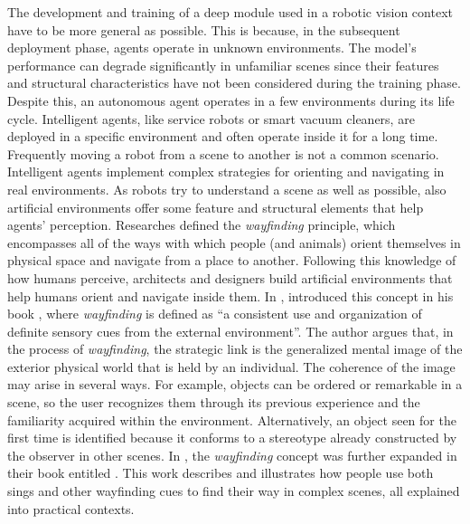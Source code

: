 The development and training of a deep module used in a robotic vision context have to be more general as possible. This is because, in the subsequent deployment phase, agents operate in unknown environments. The model's performance can degrade significantly in unfamiliar scenes since their features and structural characteristics have not been considered during the training phase. Despite this, an autonomous agent operates in a few environments during its life cycle. Intelligent agents, like service robots or smart vacuum cleaners, are deployed in a specific environment and often operate inside it for a long time. Frequently moving a robot from a scene to another is not a common scenario. Intelligent agents implement complex strategies for orienting and navigating in real environments. As robots try to understand a scene as well as possible, also artificial environments offer some feature and structural elements that help agents' perception. Researches defined the \textit{wayfinding} principle, which encompasses all of the ways with which people (and animals) orient themselves in physical space and navigate from a place to another. Following this knowledge of how humans perceive, architects and designers build artificial environments that help humans orient and navigate inside them. In \citeyear{imageofcity}, \citeauthor{imageofcity} introduced this concept in his book , where \textit{wayfinding} is defined as ``a consistent use and organization of definite sensory cues from the external environment''.  The author argues that, in the process of \textit{wayfinding}, the strategic link is the generalized mental image of the exterior physical world that is held by an individual. The coherence of the image may arise in several ways. For example, objects can be ordered or remarkable in a scene, so the user recognizes them through its previous experience and the familiarity acquired within the environment. Alternatively, an object seen for the first time is identified because it
conforms to a stereotype already constructed by the observer in other scenes. In \citeyear{wayfinding}, the \textit{wayfinding} concept was further expanded in their book entitled  \cite{wayfinding}. This work describes and illustrates how people use both sings and other wayfinding cues to find their way in complex scenes, all explained into practical contexts. 
